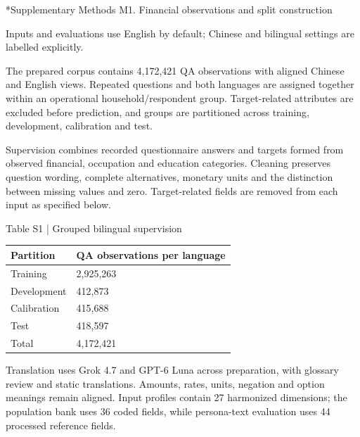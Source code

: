 \documentclass[10pt]{article}
\makeatletter
\renewcommand\section{\@startsection{section}{1}{\z@}{-2.2ex plus -1ex minus -.2ex}{.9ex plus .2ex}{\normalfont\large\mdseries}}
\makeatother
\begin{document}
\clearpage\small\raggedbottom

\section*{Supplementary Methods M1. Financial observations and split construction}

Inputs and evaluations use English by default; Chinese and bilingual settings are labelled explicitly.

The prepared corpus contains 4,172,421 QA observations with aligned Chinese and English views. Repeated questions and both languages are assigned together within an operational household/respondent group. Target-related attributes are excluded before prediction, and groups are partitioned across training, development, calibration and test.

Supervision combines recorded questionnaire answers and targets formed from observed financial, occupation and education categories. Cleaning preserves question wording, complete alternatives, monetary units and the distinction between missing values and zero. Target-related fields are removed from each input as specified below.


\begin{center}
\begin{minipage}{\textwidth}
\fontsize{8.5}{10.3}\selectfont
Table S1 | Grouped bilingual supervision
\par\vspace{4pt}
\begin{tabularx}{\textwidth}{@{}XX@{}}
\toprule
Partition & QA observations per language \\
\midrule
Training & 2,925,263 \\
Development & 412,873 \\
Calibration & 415,688 \\
Test & 418,597 \\
Total & 4,172,421 \\
\bottomrule
\end{tabularx}
\par{}
\end{minipage}
\end{center}

Translation uses Grok 4.7 and GPT-6 Luna across preparation, with glossary review and static translations. Amounts, rates, units, negation and option meanings remain aligned. Input profiles contain 27 harmonized dimensions; the population bank uses 36 coded fields, while persona-text evaluation uses 44 processed reference fields.
\end{document}
